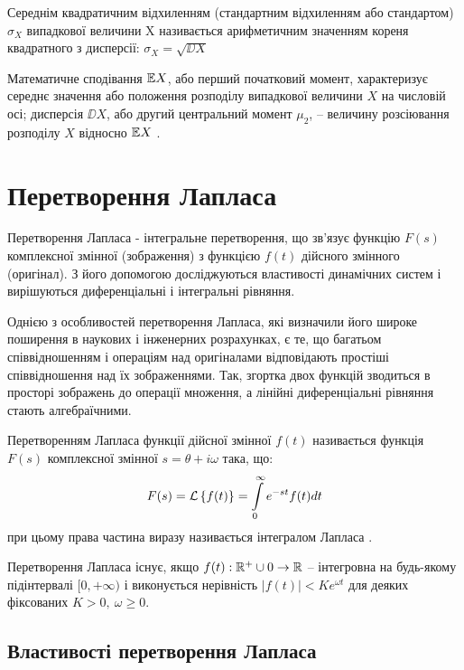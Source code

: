 \begin{defin}
	Середнім квадратичним відхиленням (стандартним відхиленням або стандартом) $\sigma_X$ випадкової величини X називається арифметичним значенням кореня квадратного з дисперсії: $\sigma_X = \sqrt{\DD X}$
\end{defin}

Математичне сподівання $\mathbb{E} X$, або перший початковий момент, характеризує середнє значення або положення розподілу випадкової величини $X$ на числовій осі; дисперсія $\DD X$, або другий центральний момент $\mu_2$, – величину розсіювання розподілу $X$ відносно $\mathbb{E} X$ \cite{gmurman1977theory}.

\section{Перетворення Лапласа}

Перетворення Лапласа - інтегральне перетворення, що зв'язує функцію $F(s)$ комплексної змінної (зображення) з функцією $f(t)$ дійсного змінного (оригінал). З його допомогою досліджуються властивості динамічних систем і вирішуються диференціальні і інтегральні рівняння.

Однією з особливостей перетворення Лапласа, які визначили його широке поширення в наукових і інженерних розрахунках, є те, що багатьом співвідношенням і операціям над оригіналами відповідають простіші співвідношення над їх зображеннями. Так, згортка двох функцій зводиться в просторі зображень до операції множення, а лінійні диференціальні рівняння стають алгебраїчними.

\begin{defin}
	Перетворенням Лапласа функції дійсної змінної $f(t)$ називається функція $F(s)$ комплексної змінної $s=\theta + i\omega$ така, що:
	\begin{equation}
		F(s)=\mathcal{L}\left\{f(t)\right\}=\int\limits_0^\infty e^{-st} f(t) dt
	\end{equation}
	при цьому права частина виразу називається інтегралом Лапласа \cite{mclachlan2014laplace}.
\end{defin}

Перетворення Лапласа існує, якщо $f(t): \mathbb{R}^+ \cup {0} \rightarrow \mathbb{R}$ – інтегровна на будь-якому підінтервалі $[0, +\infty)$ і виконується нерівність $|f(t)| < K e^{\omega t}$ для деяких фіксованих $K > 0, ~\omega ≥ 0$.

\subsection{Властивості перетворення Лапласа}

